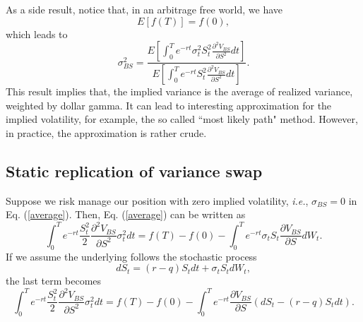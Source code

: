 \documentclass[12pt]{article}
\begin{document}
    As a side result, notice that, in an arbitrage free world, we have
    \begin{equation}
      E\left[f(T)\right]=f(0),
    \end{equation}
    which leads to
    \begin{equation}
      \sigma_{BS}^2=\frac{\displaystyle E\left[\int_0^Te^{-rt}\sigma_t^2S_t^2\frac{\partial^2 V_{BS}}{\partial S^2}dt\right]}
                         {\displaystyle E\left[\int_0^Te^{-rt}S_t^2\frac{\partial^2 V_{BS}}{\partial S^2}dt\right]}.
    \end{equation}
    This result implies that, the implied variance is the average of realized variance,
    weighted by dollar gamma. It can lead to interesting approximation for the implied
    volatility, for example, the so called ``most likely path" method. However, in practice, the approximation is rather crude.

  \subsection{Static replication of variance swap}

    Suppose we risk manage our position with zero implied volatility, {\it i.e.}, $\sigma_{BS}=0$ in Eq. (\ref{average}). Then,
    Eq. (\ref{average}) can be written as
    \begin{equation}
      \int_0^Te^{-rt}\frac{S_t^2}{2}\frac{\partial^2 V_{BS}}{\partial S^2}\sigma_t^2dt
      =f(T)-f(0)-\int_0^Te^{-rt}\sigma_tS_t\frac{\partial V_{BS}}{\partial S}dW_t.
    \end{equation}
    If we assume the underlying follows the stochastic process
    \begin{equation}
      dS_t=(r-q)S_tdt+\sigma_tS_tdW_t,
    \end{equation}  
    the last term becomes
    \begin{equation}
      \int_0^Te^{-rt}\frac{S_t^2}{2}\frac{\partial^2 V_{BS}}{\partial S^2}\sigma_t^2dt
      =f(T)-f(0)-\int_0^Te^{-rt}\frac{\partial V_{BS}}{\partial S}\left(dS_t-(r-q)S_tdt\right).
      \label{rep1}
    \end{equation}
\end{document}
